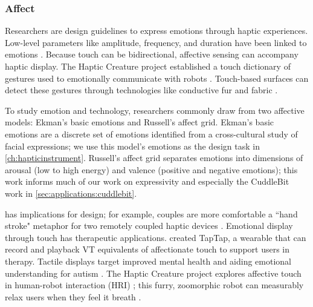 

\subsubsection{Affect}
Researchers are  design guidelines to express emotions through haptic experiences.
Low-level parameters like amplitude, frequency, and duration have been linked to emotions \citet{YongjaeYoo2015} 
\citet{Obrist2015}.
Because touch can be bidirectional, affective sensing can accompany haptic display.
The Haptic Creature project established a touch dictionary of gestures used to emotionally communicate with robots \cite{Yohanan2011affectivetouch}.
Touch-based surfaces can detect these gestures \cite{Flagg2013} through technologies like conductive fur and fabric \cite{Flagg2012}.

To study emotion and technology, researchers commonly draw from two affective models:
Ekman's basic emotions and Russell's affect grid.
Ekman's basic emotions \cite{Ekman1992,Ekman1971} are a discrete set of emotions identified from a cross-cultural study of facial expressions; we use this model's emotions as the design task in \autoref{ch:hapticinstrument}.
Russell's affect grid \cite{Russell1989circumplexmodel,Russell1989affectgrid} separates emotions into dimensions of arousal (low to high energy) and valence (positive and negative emotions); this work informs much of our work on expressivity and especially the CuddleBit work in \autoref{sec:applications:cuddlebit}.

 has implications for design;
for example, couples are more comfortable  a ``hand stroke" metaphor for two remotely coupled haptic devices \cite{Smith2007}.
Emotional display through touch has therapeutic applications.
\citet{Bonanni2006} created TapTap, a wearable that can record and playback VT equivalents of affectionate touch to support users in therapy.
Tactile displays target improved mental health \cite{Vaucelle2009} and aiding emotional understanding for autism \cite{Changeon2012}.
The Haptic Creature project explores affective touch in human-robot interaction (HRI) \cite{Yohanan2005,Yohanan2009,Yohanan2011affectivetouch,Yohanan2011affectdisplay};
this furry, zoomorphic robot can measurably relax users when they feel it breath \cite{Sefidgar2016}.





